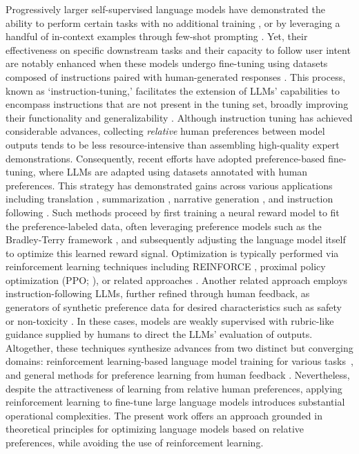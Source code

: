 Progressively larger self-supervised language models have demonstrated the ability to perform certain tasks with no additional training \citep{radford2019language}, or by leveraging a handful of in-context examples through few-shot prompting \citep{gpt3,megatron,chowdhery2022palm}. Yet, their effectiveness on specific downstream tasks and their capacity to follow user intent are notably enhanced when these models undergo fine-tuning using datasets composed of instructions paired with human-generated responses \citep{mishra-etal-2022-cross,sanh2022multitask,chung2022scaling,thoppilan2022lamda}. This process, known as ‘instruction-tuning,’ facilitates the extension of LLMs’ capabilities to encompass instructions that are not present in the tuning set, broadly improving their functionality and generalizability \citep{chung2022scaling}. Although instruction tuning has achieved considerable advances, collecting \textit{relative} human preferences between model outputs tends to be less resource-intensive than assembling high-quality expert demonstrations. Consequently, recent efforts have adopted preference-based fine-tuning, where LLMs are adapted using datasets annotated with human preferences. This strategy has demonstrated gains across various applications including translation \citep{kreutzer-etal-2018-reliability}, summarization \citep{stiennon2022learning,ziegler2020finetuning}, narrative generation \citep{ziegler2020finetuning}, and instruction following \citep{ouyang2022training,ramamurthy2023is}. Such methods proceed by first training a neural reward model to fit the preference-labeled data, often leveraging preference models such as the Bradley-Terry framework \citep{bradley1952rankanalysis}, and subsequently adjusting the language model itself to optimize this learned reward signal. Optimization is typically performed via reinforcement learning techniques including REINFORCE \citep{williams1992reinforce}, proximal policy optimization (PPO; \cite{schulman2017proximal}), or related approaches \citep{ramamurthy2023is}. Another related approach employs instruction-following LLMs, further refined through human feedback, as generators of synthetic preference data for desired characteristics such as safety or non-toxicity \citep{bai2022constitutional}. In these cases, models are weakly supervised with rubric-like guidance supplied by humans to direct the LLMs’ evaluation of outputs. Altogether, these techniques synthesize advances from two distinct but converging domains: reinforcement learning-based language model training for various tasks~\citep{Ranzato2015SequenceLT,paulus2018a,wu2018learning}, and general methods for preference learning from human feedback \citep{christiano2017deep,kupcsik2018learning}. Nevertheless, despite the attractiveness of learning from relative human preferences, applying reinforcement learning to fine-tune large language models introduces substantial operational complexities. The present work offers an approach grounded in theoretical principles for optimizing language models based on relative preferences, while avoiding the use of reinforcement learning.

